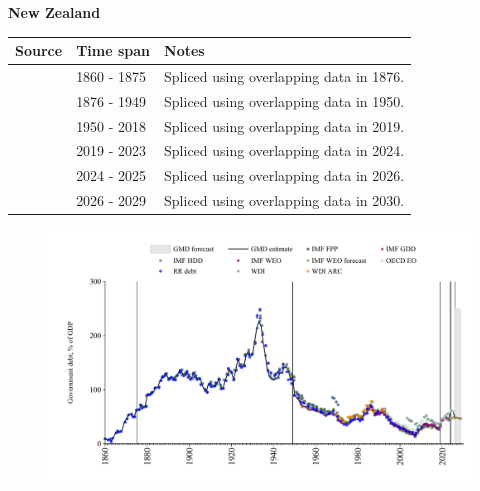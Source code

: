 \documentclass[12pt,a4paper,landscape]{article}
\begin{document}
\begin{adjustbox}{max totalsize={\paperwidth}{\paperheight},center}
\begin{minipage}[t][\textheight][t]{\textwidth}
\vspace*{0.5cm}
{}
\begin{center}
{\Large\bfseries New Zealand}
\end{center}
\vspace{0.5cm}
\begin{table}[H]
\centering
\small
\begin{tabular}{|l|l|l|}
\hline
\textbf{Source} & \textbf{Time span} & \textbf{Notes} \\
\hline
\rowcolor{white}\cite{IMF_HDD}& 1860 - 1875 &Spliced using overlapping data in 1876.\\
\rowcolor{lightgray}\cite{IMF_FPP}& 1876 - 1949 &Spliced using overlapping data in 1950.\\
\rowcolor{white}\cite{IMF_GDD}& 1950 - 2018 &Spliced using overlapping data in 2019.\\
\rowcolor{lightgray}\cite{IMF_FPP}& 2019 - 2023 &Spliced using overlapping data in 2024.\\
\rowcolor{white}\cite{OECD_EO}& 2024 - 2025 &Spliced using overlapping data in 2026.\\
\rowcolor{lightgray}\cite{IMF_WEO_forecast}& 2026 - 2029 &Spliced using overlapping data in 2030.\\
\hline
\end{tabular}
\end{table}
\begin{figure}[H]
\centering
\includegraphics[width=\textwidth,height=0.6\textheight,keepaspectratio]{graphs/NZL_govdebt_GDP.pdf}
\end{figure}
\end{minipage}
\end{adjustbox}
\end{document}
